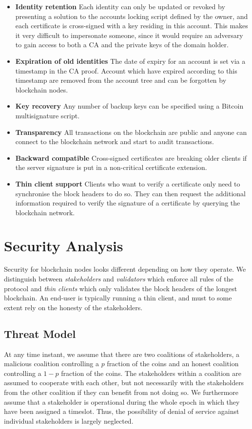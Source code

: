 \documentclass{style/kththesis}
\begin{document}
\begin{itemize}
    \item[\checkmark] \textbf{Identity retention} Each identity can only be updated or revoked by presenting a solution to the accounts locking script defined by the owner, and each certificate is cross-signed with a key residing in this account. This makes it very difficult to impersonate someone, since it would require an adversary to gain access to both a CA and the private keys of the domain holder.
    \item[\checkmark] \textbf{Expiration of old identities} The date of expiry for an account is set via a timestamp in the CA proof. Account which have expired according to this timestamp are removed from the account tree and can be forgotten by blockchain nodes.
    \item[\checkmark] \textbf{Key recovery} Any number of backup keys can be specified using a Bitcoin multisignature script.
    \item[\checkmark] \textbf{Transparency} All transactions on the blockchain are public and anyone can connect to the blockchain network and start to audit transactions.
    \item[\checkmark] \textbf{Backward compatible} Cross-signed certificates are breaking older clients if the server signature is put in a non-critical certificate extension.
    \item[\checkmark] \textbf{Thin client support} Clients who want to verify a certificate only need to synchronise the block headers to do so. They can then request the additional information required to verify the signature of a certificate by querying the blockchain network.
\end{itemize}

\section{Security Analysis}
Security for blockchain nodes looks different depending on how they operate. We distinguish between \emph{stakeholders} and \emph{validators} which enforce all rules of the protocol and \emph{thin clients} which only validates the block headers of the longest blockchain. An end-user is typically running a thin client, and must to some extent rely on the honesty of the stakeholders.

\subsection{Threat Model}
\label{sec:threat-model}
At any time instant, we assume that there are two coalitions of stakeholders, a malicious coalition controlling a $p$ fraction of the coins and an honest coalition controlling a $1 - p$ fraction of the coins. The stakeholders within a coalition are assumed to cooperate with each other, but not necessarily with the stakeholders from the other coalition if they can benefit from not doing so. We furthermore assume that a stakeholder is operational during the whole epoch in which they have been assigned a timeslot. Thus, the possibility of denial of service against individual stakeholders is largely neglected.
\end{document}

